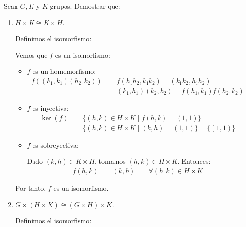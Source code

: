 \begin{ejercicio}
    Sean $G,H$ y $K$ grupos. Demostrar que:
    \begin{enumerate}
        \item $H\times K\cong K\times H$.
        
        Definimos el isomorfismo:

        Vemos que $f$ es un isomorfismo:
        \begin{itemize}
            \item $f$ es un homomorfismo:
                \begin{align*}
                    f((h_1,k_1)(h_2,k_2)) &= f(h_1h_2,k_1k_2) = (k_1k_2,h_1h_2)\\
                    &= (k_1,h_1)(k_2,h_2) = f(h_1,k_1)f(h_2,k_2)
                \end{align*}
            \item $f$ es inyectiva:
                \begin{align*}
                    \ker (f) &= \{(h,k)\in H\times K\mid f(h,k)=(1,1)\}\\
                    &= \{(h,k)\in H\times K\mid (k,h)=(1,1)\} = \{(1,1)\}
                \end{align*}
            \item $f$ es sobreyectiva:
                
            Dado $(k,h)\in K\times H$, tomamos $(h,k)\in H\times K$. Entonces:
                \begin{align*}
                    f(h,k) &= (k,h) \qquad \forall (h,k)\in H\times K
                \end{align*}
        \end{itemize}

        Por tanto, $f$ es un isomorfismo.
        \item $G\times (H\times K)\cong (G\times H)\times K$.
        
        Definimos el isomorfismo:


\end{enumerate}
\end{ejercicio}
